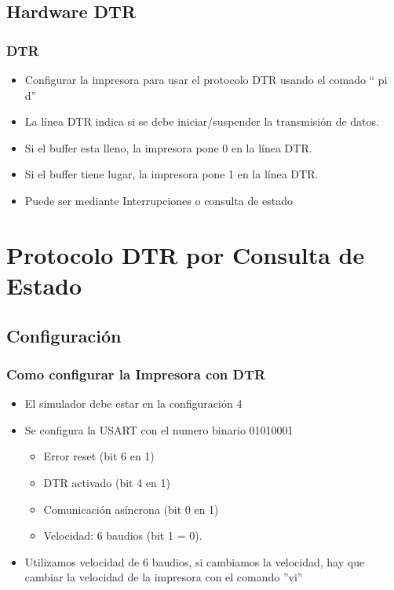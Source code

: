 \documentclass{beamer}
\begin{document}
\subsection{Hardware DTR}
\begin{frame}[fragile]
\frametitle{DTR}
\begin{itemize}
 \item Configurar la impresora para usar el protocolo DTR usando el comado `` pi d'' 
 \item La línea DTR indica si se debe iniciar/suspender la transmisión de datos.
 \item Si el buffer esta lleno, la impresora pone 0 en la línea DTR.
 \item Si el buffer tiene lugar, la impresora pone 1 en la línea DTR.
 \item Puede ser mediante Interrupciones o consulta de estado
\end{itemize}

\end{frame}

\section{Protocolo DTR por Consulta de Estado}

\subsection{Configuración}
\begin{frame}[fragile]
\frametitle{Como configurar la Impresora con DTR}
\begin{itemize}
 \item El simulador debe estar en la configuración 4
 \item Se configura la USART con el numero binario 01010001
 \begin{itemize}
 \item Error reset (bit 6 en 1)
 \item DTR activado (bit 4 en 1)
 \item Comunicación asíncrona (bit 0 en 1)
 \item Velocidad: 6 baudios (bit 1 = 0).
\end{itemize}
\item Utilizamos velocidad de 6 baudios, si cambiamos la velocidad, hay que cambiar la velocidad de la impresora con el comando ''vi''
\end{itemize}
\end{frame}
\end{document}
